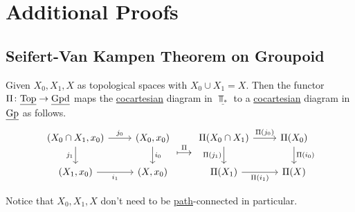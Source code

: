 \chapter{Additional Proofs}
\section{Seifert-Van Kampen Theorem on Groupoid}\label{thm:Seifert-Van-Kampen-Theorem-on-groupoid}
\begin{theorem}
	Given \(X_0, X_1, X\) as topological spaces with \(X_0 \cup X_1 = X\). Then the functor \(\Pi \colon \underline{\mathrm{Top}}\to \underline{\mathrm{Gpd}}\) maps the
	\hyperref[def:cocartesian]{cocartesian} diagram in \(\underline{\Top _\ast}\) to a \hyperref[def:cocartesian]{cocartesian} diagram in \(\underline{\mathrm{Gp} }\)
	as follows.
	\[
		\begin{tikzcd}
			{(X_0\cap X_1, x_0)} & {(X_0, x_0)} \\
			{(X_1, x_0)} & {(X, x_0)}
			\arrow["{j_0}", from=1-1, to=1-2]
			\arrow["{i_0}", from=1-2, to=2-2]
			\arrow["{i_1}"', from=2-1, to=2-2]
			\arrow["{j_1}"', from=1-1, to=2-1]
		\end{tikzcd}\overset{\Pi}{\longmapsto}
		\begin{tikzcd}
			{\Pi(X_0\cap X_1)} & {\Pi(X_0)} \\
			{\Pi(X_1)} & {\Pi(X)}
			\arrow["{\Pi (j_0)}", from=1-1, to=1-2]
			\arrow["{\Pi (i_0)}", from=1-2, to=2-2]
			\arrow["{\Pi (i_1)}"', from=2-1, to=2-2]
			\arrow["{\Pi (j_1)}"', from=1-1, to=2-1]
		\end{tikzcd} \]
\end{theorem}
\begin{note}
	Notice that \(X_0, X_1, X\) don't need to be \hyperref[def:path]{path}-connected in particular.
\end{note}

